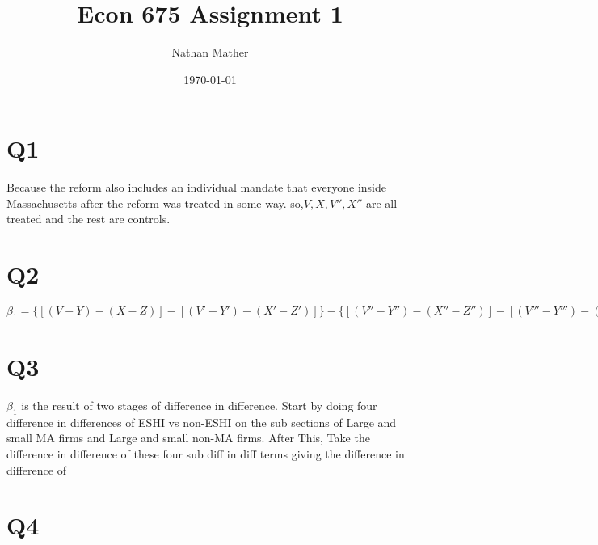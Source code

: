\documentclass[11pt]{article}
\title{Econ 675 Assignment 1} %
\author{Nathan Mather} %
\date{\today} %
\begin{document}
	
\maketitle %

\setcounter{tocdepth}{2} %

\tableofcontents %


\section{Q1}

Because the reform also includes an individual mandate that everyone inside Massachusetts after the reform was treated in some way. so,$ V, X, V'',X''$ are all treated and the rest are controls. 


\section{Q2}

$\beta_1 = \{[(V-Y) - (X-Z)] - [(V'-Y') - (X'-Z')]\} - \{[(V'' - Y'') - (X''-Z'')] - [(V'''-Y''')-(X'''-Z''')]\}$

\section{Q3}

$\beta_1$ is the result of two stages of difference in difference. Start by doing four difference in differences of ESHI vs non-ESHI on the sub sections of Large and small MA firms and Large and small non-MA firms. After This, Take the difference in difference of these four sub diff in diff terms giving the difference in difference of 

\section{Q4}


\end{document}
